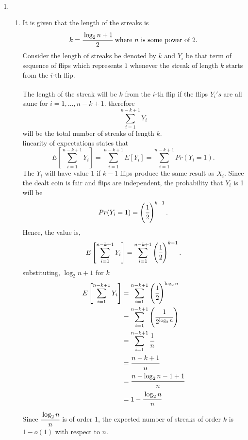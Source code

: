 \documentclass{article}
\begin{document}
\begin{enumerate}
\newpage
\item
    \begin{enumerate}
        \item
            It is given that the length of the streaks is
            \[ 
                k = \cfrac{\log_{2}{n+1}}{2} \text{ where } n \text{ is some power of 2.} 
            \]
            Consider the length of streaks be denoted by \(k\) and \(Y_i\) be that term of sequence of flips which 
            represents \(1\) whenever the streak of length \(k\) starts from the \(i\)-th flip.\\\\
            The length of the streak will be \( k \) from the \(i\)-th flip if the flips \(Y_i's\) are all same for \(i = 1,\ldots,n-k+1\).
            therefore
            \[ 
                \sum_{i=1}^{n-k+1} Y_i
            \]
            will be the total number of streaks of length \(k\).\\
            linearity of expectations states that
            \[
                E\left[\sum_{i=1}^{n-k+1} Y_i\right] = \sum_{i=1}^{n-k+1} E[Y_i] = \sum_{i=1}^{n-k+1} Pr(Y_i = 1).
            \]
            The \( Y_i \) will have value 1 if \( k-1 \) flips produce the same result as \( X_i \). Since the dealt coin is fair and flips are independent, the probability that \( Y_i \) is 1 will be
            \[
                Pr(Y_i = 1) = \left(\cfrac{1}{2}\right)^{k-1}.
            \]
            Hence, the value is,
            \[
                E\left[\sum_{i=1}^{n-k+1} Y_i\right] = \sum_{i=1}^{n-k+1} \left(\cfrac{1}{2}\right)^{k-1}.
            \]
            substituting, \( \log_{2}{n+1} \) for \( k \)
            \begin{align*}
                E\left[\sum_{i=1}^{n-k+1} Y_i\right] &= \sum_{i=1}^{n-k+1} \left(\cfrac{1}{2}\right)^{\log_2 n}\\
                &= \sum_{i=1}^{n-k+1} \left(\cfrac{1}{2^{\log_2 n}}\right)\\
                &= \sum_{i=1}^{n-k+1} \cfrac{1}{n}\\
                &= \cfrac{n-k+1}{n}\\
                &= \cfrac{n - \log_2 n - 1 + 1}{n}\\
                &= 1 - \cfrac{\log_2 n}{n}
            \end{align*}
            Since \(\cfrac{\log_2 n}{n}\) is of order 1, the expected number of streaks of order \(k\) is \(1 - o(1)\) with respect to \(n\).\\\\

\end{enumerate}
\end{enumerate}
\end{document}
